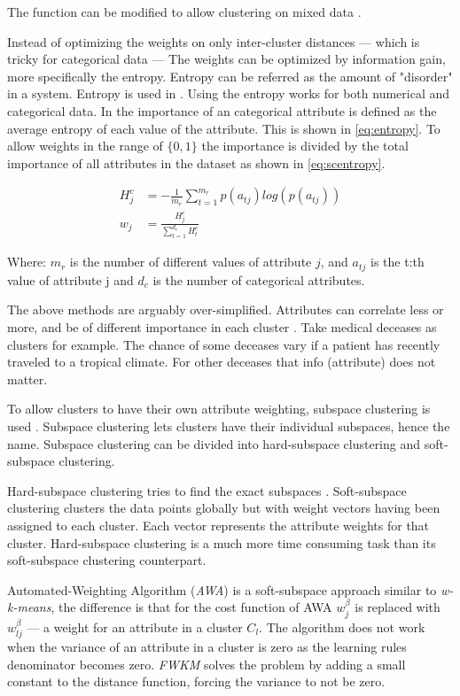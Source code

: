 \documentclass[../report.tex]{subfiles}
\begin{document}
The function can be modified to allow clustering on mixed data \cite{Jia2018}.

Instead of optimizing the weights on only inter-cluster distances --- which is tricky for categorical data --- The weights can be optimized by information gain, more specifically the entropy. Entropy can be referred as the amount of "disorder" in a system. Entropy is used in \cite{Cheung2013, Jing2007}. Using the entropy works for both numerical and categorical data. In \cite{Cheung2013} the importance of an categorical attribute is defined as the average entropy of each value of the attribute. This is shown in \ref{eq:entropy}. To allow weights in the range of $\{0,1\}$ the importance is divided by the total importance of all attributes in the dataset as shown in \ref{eq:scentropy}.

\begin{align}
  H_j^c & =  - \frac{1}{m_r} \sum^{m_r}_{t = 1}{p(a_{tj}) log(p(a_{tj}))} 
\label{eq:entropy} \\
  w_j & = \frac{H_j^c}{\sum_{t = 1}^{d_c}{H_t^c}}
  \label{eq:scentropy}
\end{align}

Where:
${m_r}$ is the number of different values of attribute $j$, and $a_{tj}$ is the t:th value of attribute j and $d_c$ is the number of categorical attributes.

The above methods are arguably over-simplified. Attributes can correlate less or more, and be of different importance in each cluster . Take medical deceases as clusters for example. The chance of some deceases vary if a patient has recently traveled to a tropical climate. For other deceases that info (attribute) does not matter.

To allow clusters to have their own attribute weighting, subspace clustering is used \cite{DENG201684, Jing2007, Jia2018, Kriegler2012}. Subspace clustering lets clusters have their individual subspaces, hence the name. Subspace clustering can be divided into hard-subspace clustering and soft-subspace clustering.

Hard-subspace clustering tries to find the exact subspaces \cite{Kriegler2012, Jia2018, Jing2007,DENG201684}. Soft-subspace clustering clusters the data points globally but with weight vectors having been assigned to each cluster. Each vector represents the attribute weights for that cluster. Hard-subspace clustering is a much more time consuming task than its soft-subspace clustering counterpart.

Automated-Weighting Algorithm (\textit{AWA}) \cite{Chan2004} is a soft-subspace approach similar to \textit{w-k-means}, the difference is that for the cost function of AWA $w_j^\beta$ is replaced with $w_{ lj }^\beta$ --- a weight for an attribute in a cluster $C_l$. The algorithm does not work when the variance of an attribute in a cluster is zero as the learning rules denominator becomes zero. \textit{ FWKM } \cite{Jing2005} solves the problem by adding a small constant to the distance function, forcing the variance to not be zero.
\end{document}
